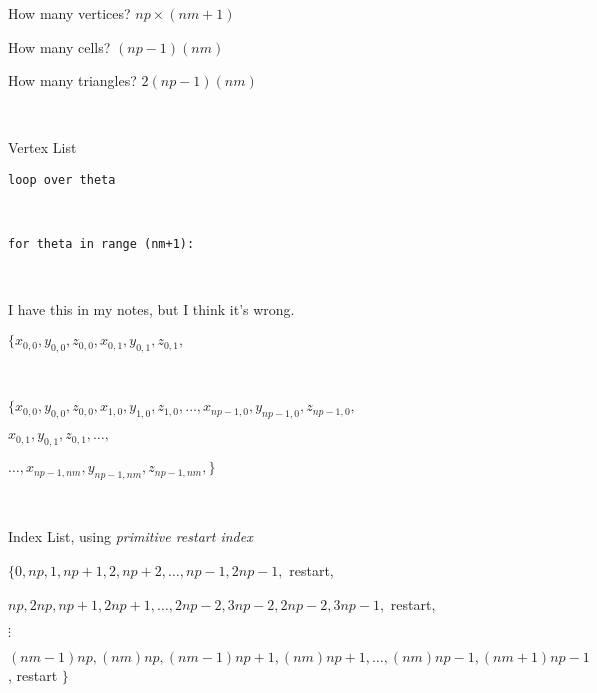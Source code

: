 How many vertices?  $np\times (nm+1)$

How many cells? $(np-1)(nm)$

How many triangles? $2(np-1)(nm)$

\

Vertex List 

{\tt loop over theta}


\

{\tt for theta in range (nm+1):}


\qquad {}

\

{\color{red}  I have this in my notes, but I think it's wrong. 

$\{ 
	x_{0,0}, y_{0,0}, z_{0,0},
	x_{0,1}, y_{0,1}, z_{0,1},
$
}

\

$\{ 
	x_{0,0}, y_{0,0}, z_{0,0},
	x_{1,0}, y_{1,0}, z_{1,0},
	\dots,
	x_{np-1,0}, y_{np-1,0}, z_{np-1,0},
$

\qquad$
	x_{0,1}, y_{0,1}, z_{0,1},
	\dots,
$

\qquad \qquad $
	\dots, x_{np-1,nm}, y_{np-1,nm}, z_{np-1,nm},
\}$

\

Index List, using {\it primitive restart index}

$\{ 0, np, 1, np+1, 2, np+2, \dots, np-1, 2np-1, $ restart,

$np, 2np, np+1, 2np+1, \dots, 2np-2, 3np-2, 2np-2, 3np-1,$ restart,

$\vdots$

$(nm-1)np, (nm)np, (nm-1)np + 1, (nm)np+1, \dots, (nm)np-1, (nm+1)np - 1$, restart $\}$







